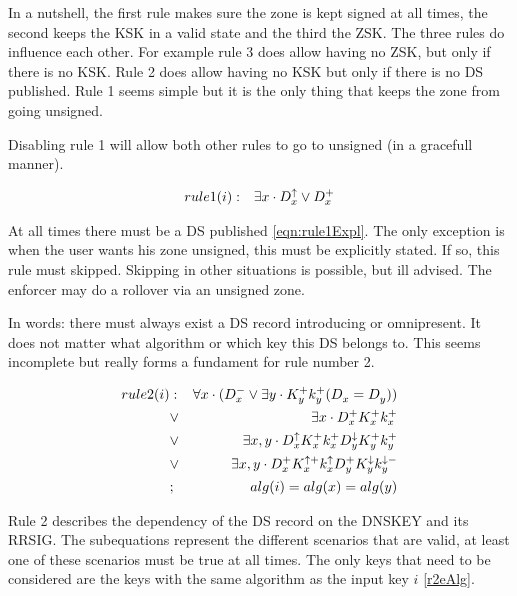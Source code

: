\documentclass[twoside, a4paper]{article}
\begin{document}
In a nutshell, the first rule makes sure the zone is kept signed at all times, the second keeps the KSK in a valid state and the third the ZSK. The three rules do influence each other. For example rule 3 does allow having no ZSK, but only if there is no KSK. Rule 2 does allow having no KSK but only if there is no DS published. Rule 1 seems simple but it is the only thing that keeps the zone from going unsigned.

Disabling rule 1 will allow both other rules to go to unsigned (in a gracefull manner).

\begin{eqnarray}
\label{eqn:rule1Expl}
rule1(i)
&:& 	\exists x\cdot D_{x}^{\uparrow} \vee D_{x}^{+}
\end{eqnarray}

At all times there must be a DS published \eqref{eqn:rule1Expl}. The only exception is when the user wants his zone unsigned, this must be explicitly stated. If so, this rule must skipped. Skipping in other situations is possible, but ill advised. The enforcer may do a rollover via an unsigned zone.

In words: there must always exist a DS record introducing or omnipresent. It does not matter what algorithm or which key this DS belongs to. This seems incomplete but really forms a fundament for rule number 2.

\begin{subequations}
\label{eqn:rule2Expl}
\begin{align}
rule2(i)
&:&		\forall x \cdot (D_{x}^{-} \vee \exists y \cdot K_{y}^{+}k_{y}^{+} (D_{x}^{}=D_{y}^{}) ) \label{r2eUnsigned}\\
&\vee& 	\exists x\cdot D_{x}^{+} K_{x}^{+} k_{x}^{+} \label{r2eTrivial}\\
&\vee& 	\exists x,y\cdot D_{x}^{\uparrow} K_{x}^{+} k_{x}^{+} D_{y}^{\downarrow} K_{y}^{+} k_{y}^{+} \label{r2eMinds}\\
&\vee&	\exists x,y\cdot D_{x}^{+} K_{x}^{\uparrow +} k_{x}^{\uparrow}	D_{y}^{+} K_{y}^{\downarrow}k_{y}^{\downarrow -} \label{r2eMinkey}\\
&;&		alg(i)=alg(x)=alg(y) \label{r2eAlg}
\end{align}
\end{subequations}

Rule 2 describes the dependency of the DS record on the DNSKEY and 
its RRSIG. The subequations represent the different scenarios that 
are valid, at least one of these scenarios must be true at all 
times. The only keys that need to be considered are the keys with 
the same algorithm as the input key $i$ \eqref{r2eAlg}.
\end{document}
